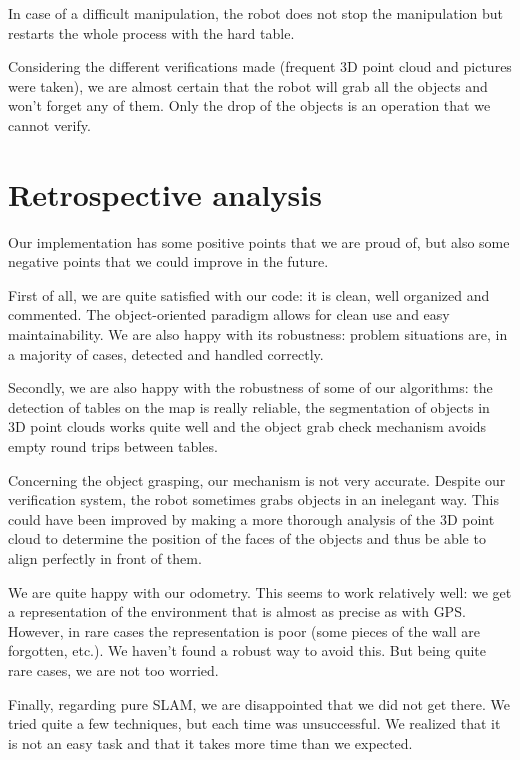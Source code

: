 \documentclass[a4paper, 10pt, conference]{ieeeconf}
\begin{document}
    In case of a difficult manipulation, the robot does not stop the manipulation but restarts the whole process with the hard table.
    
    Considering the different verifications made (frequent 3D point cloud and pictures were taken), we are almost certain that the robot will grab all the objects and won't forget any of them. Only the drop of the objects is an operation that we cannot verify.
    
    
    \section{Retrospective analysis}
    
    Our implementation has some positive points that we are proud of, but also some negative points that we could improve in the future.
    
    First of all, we are quite satisfied with our code: it is clean, well organized and commented. The object-oriented paradigm allows for clean use and easy maintainability. We are also happy with its robustness: problem situations are, in a majority of cases, detected and handled correctly.
    
    Secondly, we are also happy with the robustness of some of our algorithms: the detection of tables on the map is really reliable, the segmentation of objects in 3D point clouds works quite well and the object grab check mechanism avoids empty round trips between tables.
    
    Concerning the object grasping, our mechanism is not very accurate. Despite our verification system, the robot sometimes grabs objects in an inelegant way. This could have been improved by making a more thorough analysis of the 3D point cloud to determine the position of the faces of the objects and thus be able to align perfectly in front of them.
    
    We are quite happy with our odometry. This seems to work relatively well: we get a representation of the environment that is almost as precise as with GPS. However, in rare cases the representation is poor (some pieces of the wall are forgotten, etc.). We haven't found a robust way to avoid this. But being quite rare cases, we are not too worried.
    
    Finally, regarding pure SLAM, we are disappointed that we did not get there. We tried quite a few techniques, but each time was unsuccessful. We realized that it is not an easy task and that it takes more time than we expected.
    
\end{document}
